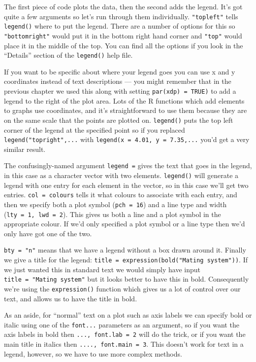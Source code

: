 \documentclass[
]{book}
\begin{document}
The first piece of code plots the data, then the second adds the legend. It's got quite a few arguments so let's run through them individually. \texttt{"topleft"} tells \texttt{legend()} where to put the legend. There are a number of options for this so \texttt{"bottomright"} would put it in the bottom right hand corner and \texttt{"top"} would place it in the middle of the top. You can find all the options if you look in the ``Details'' section of the \texttt{legend()} help file.

If you want to be specific about where your legend goes you can use x and y coordinates instead of text descriptions --- you might remember that in the previous chapter we used this along with setting \texttt{par(xdp)\ =\ TRUE)} to add a legend to the right of the plot area. Lots of the R functions which add elements to graphs use coordinates, and it's straightforward to use them because they are on the same scale that the points are plotted on. \texttt{legend()} puts the top left corner of the legend at the specified point so if you replaced \texttt{legend("topright",...} with \texttt{legend(x\ =\ 4.01,\ y\ =\ 7.35,...} you'd get a very similar result.

The confusingly-named argument \texttt{legend\ =} gives the text that goes in the legend, in this case as a character vector with two elements. \texttt{legend()} will generate a legend with one entry for each element in the vector, so in this case we'll get two entries. \texttt{col\ =\ colours} tells it what colours to associate with each entry, and then we specify both a plot symbol (\texttt{pch\ =\ 16}) and a line type and width (\texttt{lty\ =\ 1,\ lwd\ =\ 2}). This gives us both a line and a plot symbol in the appropriate colour. If we'd only specified a plot symbol or a line type then we'd only have got one of the two.

\texttt{bty\ =\ "n"} means that we have a legend without a box drawn around it. Finally we give a title for the legend: \texttt{title\ =\ expression(bold("Mating\ system"))}. If we just wanted this in standard text we would simply have input \texttt{title\ =\ "Mating\ system"} but it looks better to have this in bold. Consequently we're using the \texttt{expression()} function which gives us a lot of control over our text, and allows us to have the title in bold.

As an aside, for ``normal'' text on a plot such as axis labels we can specify bold or italic using one of the \texttt{font...} parameters as an argument, so if you want the axis labels in bold then \texttt{...,\ font.lab\ =\ 2} will do the trick, or if you want the main title in italics then \texttt{....,\ font.main\ =\ 3}. This doesn't work for text in a legend, however, so we have to use more complex methods.
\end{document}
